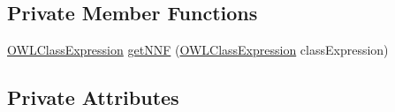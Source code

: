 \subsection*{Private Member Functions}
\begin{DoxyCompactItemize}
\item 
\hyperlink{interfaceorg_1_1semanticweb_1_1owlapi_1_1model_1_1_o_w_l_class_expression}{O\-W\-L\-Class\-Expression} \hyperlink{classorg_1_1semanticweb_1_1owlapi_1_1api_1_1test_1_1axioms_1_1_n_n_f_test_case_ac53f4996b6c3376236202ad843a211fc}{get\-N\-N\-F} (\hyperlink{interfaceorg_1_1semanticweb_1_1owlapi_1_1model_1_1_o_w_l_class_expression}{O\-W\-L\-Class\-Expression} class\-Expression)
\end{DoxyCompactItemize}
\subsection*{Private Attributes}
